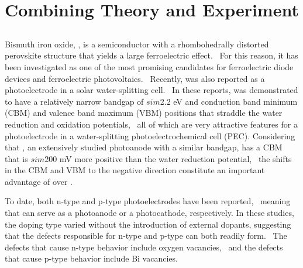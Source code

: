
\section{Combining Theory and Experiment}

\subsection{}

Bismuth iron oxide, , is a semiconductor with a rhombohedrally distorted perovskite structure that yields a large ferroelectric effect.~\cite{choi2009switchable} For this reason, it has been investigated as one of the most promising candidates for ferroelectric diode devices and ferroelectric photovoltaics.~\cite{choi2009switchable,yi2011mechanism,you2018enhancing,spanier2016power} Recently,  was also reported as a photoelectrode in a solar water-splitting cell.~\cite{shen2017dual,yilmaz2016perovskite,moniz2015visible,song2018domain,liu2016enhanced} In these reports,  was demonstrated to have a relatively narrow bandgap of $sim$2.2 eV and conduction band minimum (CBM) and valence band maximum (VBM) positions that straddle the water reduction and oxidation potentials,~\cite{shen2017dual,yilmaz2016perovskite} all of which are very attractive features for a photoelectrode in a water-splitting photoelectrochemical cell (PEC). Considering that , an extensively studied photoanode with a similar bandgap, has a CBM that is $sim$200 mV more positive than the water reduction potential,~\cite{sivula2016semiconducting} the shifts in the CBM and VBM to the negative direction constitute an important advantage of  over .~\cite{lee2019progress}

To date, both n-type and p-type  photoelectrodes have been reported,~\cite{shen2017dual,yilmaz2016perovskite,moniz2015visible,song2018domain,liu2016enhanced} meaning that  can serve as a photoanode or a photocathode, respectively. In these studies, the doping type varied without the introduction of external dopants, suggesting that the defects responsible for n-type and p-type  can both readily form.~\cite{lee2019progress} The defects that cause n-type behavior include oxygen vacancies,~\cite{paudel2012intrinsic} and the defects that cause p-type behavior include Bi vacancies.~\cite{rojac2017domain}

